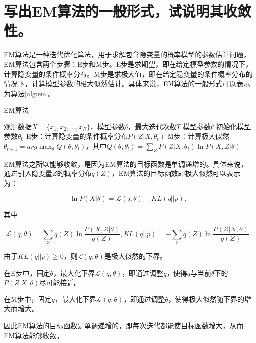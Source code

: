 \documentclass{article}
\begin{document}
\section{写出EM算法的一般形式，试说明其收敛性。}

EM算法是一种迭代优化算法，用于求解包含隐变量的概率模型的参数估计问题。EM算法包含两个步骤：E步和M步。E步是求期望，即在给定模型参数的情况下，计算隐变量的条件概率分布。M步是求极大值，即在给定隐变量的条件概率分布的情况下，计算模型参数的极大似然估计。具体来说，EM算法的一般形式可以表示为算法\ref{alg:em}。

\begin{algorithm}[htbp]
    \caption{EM算法}
    \label{alg:em}
    \begin{algorithmic}[1]
        \Require 观测数据$X=\{x_1,x_2,\dots,x_N\}$，模型参数$\theta$，最大迭代次数$T$
        \Ensure 模型参数$\theta$
        \State 初始化模型参数$\theta_0$
        \Repeat
            \State E步：计算隐变量的条件概率分布$P(Z|X,\theta_t)$
            \State M步：计算极大似然$\theta_{t+1}=arg\max_{\theta}Q(\theta,\theta_t)$，其中$Q(\theta,\theta_t)=\sum_ZP(Z|X,\theta_t)\ln P(X,Z|\theta)$
    \end{algorithmic}
\end{algorithm}

EM算法之所以能够收敛，是因为EM算法的目标函数是单调递增的。具体来说，通过引入隐变量$Z$的概率分布$q(Z)$，EM算法的目标函数即极大似然可以表示为：

\begin{equation}
        \ln P(X|\theta)=\mathcal{L}(q,\theta)+KL(q||p),
\end{equation}

其中

\begin{equation}
    \mathcal{L}(q,\theta)=\sum_Zq(Z)\ln\frac{P(X,Z|\theta)}{q(Z)}, KL(q||p)=-\sum_Zq(Z)\ln\frac{P(Z|X,\theta)}{q(Z)}.
\end{equation}

由于$KL(q||p)\ge0$，则$\mathcal{L}(q,\theta)$是极大似然的下界。

在E步中，固定$\theta$，最大化下界$\mathcal{L}(q,\theta)$，即通过调整$q$，使得$q$与当前$\theta$下的$P(Z|X,\theta)$尽可能接近。

在M步中，固定$q$，最大化下界$\mathcal{L}(q,\theta)$，即通过调整$\theta$，使得极大似然随下界的增大而增大。

因此EM算法的目标函数是单调递增的，即每次迭代都能使目标函数增大，从而EM算法能够收敛。
\end{document}
